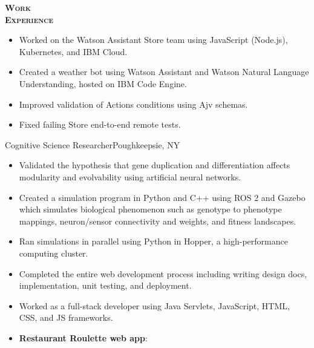 \documentclass[12pt]{article}
\begin{document}
\begin{minipage}[t]{0.15\textwidth}\vspace{-0.5em}%
  {\color{Red} \textbf{\textsc{Work\\Experience}}}
\end{minipage}
\hfill
\begin{minipage}[t]{0.82\textwidth}\vspace{-0.5em}%
  \begin{itemize}
    \item Worked on the Watson Assistant Store team using JavaScript (Node.js),
      Kubernetes, and IBM Cloud.
    \item Created a weather bot using Watson Assistant and Watson Natural
      Language Understanding, hosted on IBM Code Engine.
    \item Improved validation of Actions conditions using Ajv schemas.
    \item Fixed failing Store end-to-end remote tests.
  \end{itemize}
  \vspace{0.5em}
    {Cognitive Science Researcher}{Poughkeepsie, NY}
  \begin{itemize}
    \item Validated the hypothesis that gene duplication and
      differentiation affects modularity and evolvability using
      artificial neural networks.
    \item Created a simulation program in Python and C++ using ROS 2 and Gazebo
      which simulates biological phenomenon such as genotype to phenotype
      mappings, neuron/sensor connectivity and weights, and fitness landscapes.
    \item Ran simulations in parallel using Python in Hopper, a
      high-performance computing cluster.
  \end{itemize}
  \vspace{0.5em}
  \begin{itemize}
    \item Completed the entire web development process including writing design
      docs, implementation, unit testing, and deployment.
    \item Worked as a full-stack developer using Java Servlets, JavaScript,
      HTML, CSS, and JS frameworks.
    \item \textbf{Restaurant Roulette web app}:

\end{itemize}
\end{minipage}
\end{document}
